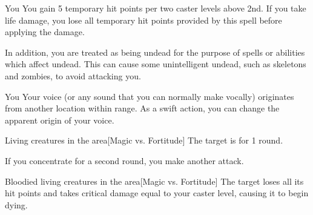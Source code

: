 \spelldur{\durlong}
\begin{spelltarget}{You}
    \spelleffect You gain 5 temporary hit points  per two caster levels above 2nd. If you take life damage, you lose all temporary hit points provided by this spell before applying the damage.

    In addition, you are treated as being undead for the purpose of spells or abilities which affect undead. This can cause some unintelligent undead, such as skeletons and zombies, to avoid attacking you.
\end{spelltarget}

\spellrng{\rngmed}
\spelldur{\durshort \dismissable}
\begin{spelltarget}{You}
    \spelleffect Your voice (or any sound that you can normally make vocally) originates from another location within range. As a swift action, you can change the apparent origin of your voice.
\end{spelltarget}

\begin{comment}
\spellsection{Vestments of the Mage}{2}
\spelldesc{You imbue a set of armor with magical power, preventing it from interfering with your spellcasting.}
\spellinfo{Trans (Imbuement)}{Arcane}
\spelltwocol{\spelltgt{One nonmagical armor or shield}}{\spellrng{Touch}}
\spelldur{\durext \dismissable}
\spelleffect The armor or shield's chance of arcane spell failure decreases by 10\% as long as you are wearing or using it. If any other creature wears the armor, it receives no benefit from this spell.
\spellnotes This decrease is considered an enhancement enhancement bonus.
\spellsr{Yes}
\end{comment}

\begin{spelltargets}{Living creatures in the area}[Magic vs. Fortitude]
    \spellsuccess The target is \staggered for 1 round.
\end{spelltargets}
\spellspecial If you concentrate for a second round, you make another attack.
\begin{spelltargets}{Bloodied living creatures in the area}[Magic vs. Fortitude]
    \spellsuccess The target loses all its hit points and takes critical damage equal to your caster level, causing it to begin dying.
\end{spelltargets}

